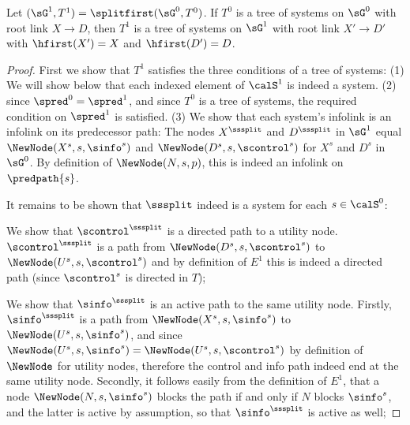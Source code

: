 \begin{lemma} \label{le:21jan25.6-first-split-preserves-tree}
Let $(\sG^1, T^1)=\splitfirst(\sG^0,T^0)$. If $T^0$ is a tree of systems  on $\sG^0$ with root link $X\to D$, then $T^1$ is a tree of systems on $\sG^1$ with root link $X'\to D'$ with $\hfirst(X')=X$ and $\hfirst(D')=D$.
\end{lemma}


\begin{proof}
First we show that $T^1$ satisfies the three conditions of a tree of systems: 
(1) We will show below that each indexed element of $\calS^1$ is indeed a system.
(2) since $\spred^0 = \spred^1$, and since $T^0$ is a tree of systems, the required condition on $\spred^1$ is satisfied. (3) We show that each system's infolink is an infolink on its predecessor path: The nodes $X^{\sssplit}$ and $D^{\sssplit}$ in $\sG^1$ equal $\NewNode(X^s,s,\sinfo^s)$ and $\NewNode(D^s, s, \scontrol^s)$ for $X^s$ and $D^s$ in $\sG^0$. By definition of $\NewNode(N,s,p)$, this is indeed an infolink on $\predpath{s}$. 

It remains to be shown that $\sssplit$ indeed is a system for each $s \in \calS^0$: 

     {We show that $\scontrol^{\sssplit}$ is a directed path to a utility node}. $\scontrol^{\sssplit}$ is a path from  $\NewNode(D^{s}, {s}, \scontrol^{s})$ to $\NewNode(U^{s}, {s}, \scontrol^{s})$ and by definition of $E^1$ this is indeed a directed path (since $\scontrol^{s}$ is directed in $T$); 
    
     {We show that $\sinfo^{\sssplit}$ is an active path to the same utility node}. Firstly, $\sinfo^{\sssplit}$ is a path from $\NewNode(X^{s}, {s}, \sinfo^{s})$ to $\NewNode(U^{s}, {s}, \sinfo^{s})$, and since $\NewNode(U^{s}, {s}, \sinfo^{s}) = \NewNode(U^{s}, {s}, \scontrol^{s})$ by definition of $\NewNode$ for utility nodes, therefore the control and info path indeed end at the same utility node. Secondly, it follows easily from the definition of $E^1$, that a node $\NewNode(N,s,\sinfo^{s})$ blocks the path if and only if $N$ blocks $\sinfo^{s}$, and the latter is active by assumption, so that $\sinfo^{\sssplit}$ is active as well;


\end{proof}
